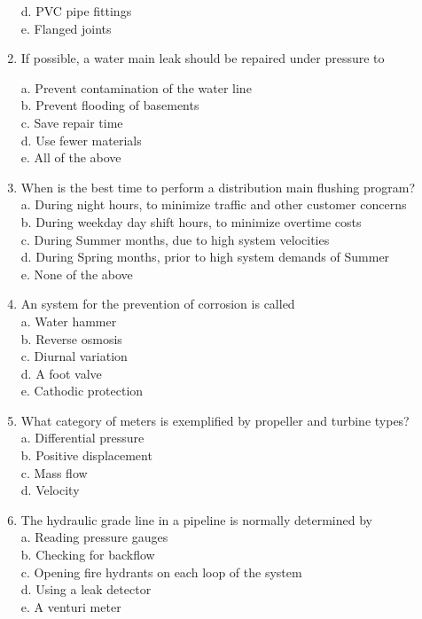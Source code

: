 \documentclass{article}
\begin{document}
\begin{enumerate}[1.]
d. PVC pipe fittings\\

e. Flanged joints\\

\item If possible, a water main leak should be repaired under pressure to

a. Prevent contamination of the water line\\

b. Prevent flooding of basements\\

c. Save repair time\\

d. Use fewer materials\\

e. All of the above\\

\item When is the best time to perform a distribution main flushing program?\\
a. During night hours, to minimize traffic and other customer concerns\\
b. During weekday day shift hours, to minimize overtime costs\\
c. During Summer months, due to high system velocities\\
d. During Spring months, prior to high system demands of Summer\\
e. None of the above\\

\item An system for the prevention of corrosion is called\\
a. Water hammer\\
b. Reverse osmosis\\
c. Diurnal variation\\
d. A foot valve\\
e. Cathodic protection\\

\item What category of meters is exemplified by propeller and turbine types?\\
a. Differential pressure\\
b.  Positive displacement \\
c. Mass flow\\
d.  Velocity\\

\item The hydraulic grade line in a pipeline is normally determined by\\
a. Reading pressure gauges\\
b. Checking for backflow\\
c. Opening fire hydrants on each loop of the system\\
d. Using a leak detector\\
e. A venturi meter\\


\end{enumerate}
\end{document}
